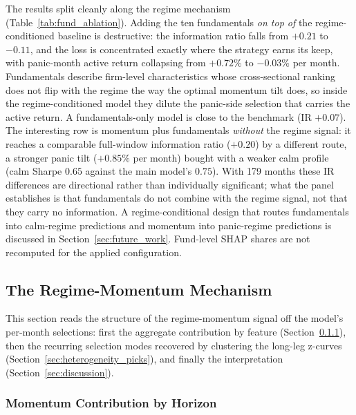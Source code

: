 The results split cleanly along the regime mechanism (Table~\ref{tab:fund_ablation}). Adding the ten fundamentals \emph{on top of} the regime-conditioned baseline is destructive: the information ratio falls from $+0.21$ to $-0.11$, and the loss is concentrated exactly where the strategy earns its keep, with panic-month active return collapsing from $+0.72\%$ to $-0.03\%$ per month. Fundamentals describe firm-level characteristics whose cross-sectional ranking does not flip with the regime the way the optimal momentum tilt does, so inside the regime-conditioned model they dilute the panic-side selection that carries the active return. A fundamentals-only model is close to the benchmark (IR $+0.07$). The interesting row is momentum plus fundamentals \emph{without} the regime signal: it reaches a comparable full-window information ratio ($+0.20$) by a different route, a stronger panic tilt ($+0.85\%$ per month) bought with a weaker calm profile (calm Sharpe $0.65$ against the main model's $0.75$). With 179 months these IR differences are directional rather than individually significant; what the panel establishes is that fundamentals do not combine with the regime signal, not that they carry no information. A regime-conditional design that routes fundamentals into calm-regime predictions and momentum into panic-regime predictions is discussed in Section~\ref{sec:future_work}. Fund-level SHAP shares are not recomputed for the applied configuration.


\subsection{The Regime-Momentum Mechanism}\label{sec:regime_results}

This section reads the structure of the regime-momentum signal off the model's per-month selections: first the aggregate contribution by feature (Section~\ref{sec:horizon_evidence}), then the recurring selection modes recovered by clustering the long-leg z-curves (Section~\ref{sec:heterogeneity_picks}), and finally the interpretation (Section~\ref{sec:discussion}).

\subsubsection{Momentum Contribution by Horizon}\label{sec:horizon_evidence}

